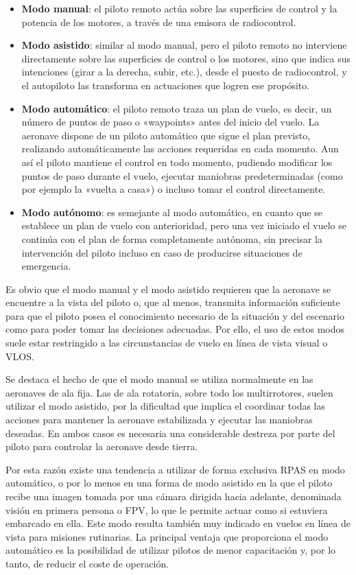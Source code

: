 \begin{itemize}
\item \textbf{Modo manual}: el piloto remoto actúa sobre las superficies de control y la potencia de los motores, 
a través de una emisora de radiocontrol.
\item \textbf{Modo asistido}: similar al modo manual, pero el piloto remoto no interviene directamente sobre las superficies de 
control o los motores, sino que indica sus intenciones (girar a la derecha, subir, etc.), desde el puesto de radiocontrol, y el 
autopiloto las transforma en actuaciones que logren ese propósito.
\item \textbf{Modo automático}: el piloto remoto traza un plan de vuelo, es decir, un número de puntos de paso o «waypoints» antes del 
inicio del vuelo. La aeronave dispone de un piloto automático que sigue el plan previsto, realizando automáticamente las acciones 
requeridas en cada momento. Aun así el piloto mantiene el control en todo momento, pudiendo modificar los puntos de paso durante el vuelo, ejecutar maniobras predeterminadas (como por ejemplo la «vuelta a casa») o incluso tomar el control directamente.
\item \textbf{Modo autónomo}: es semejante al modo automático, en cuanto que se establece un plan de vuelo con anterioridad, 
pero una vez iniciado el vuelo se continúa con el plan de forma completamente autónoma, sin precisar la intervención del piloto 
incluso en caso de producirse situaciones de emergencia.
\end{itemize}

Es obvio que el modo manual y el modo asistido requieren que la aeronave se encuentre a la vista del piloto o, que al menos, 
transmita información suficiente para que el piloto posea el conocimiento necesario de la situación y del escenario como para poder tomar las decisiones adecuadas. Por ello, el uso de estos modos suele estar restringido a las circunstancias de vuelo en línea de vista visual o \acs{VLOS}.

Se destaca el hecho de que el modo manual se utiliza normalmente en las aeronaves de ala fija. Las de ala rotatoria, 
sobre todo los multirrotores, suelen utilizar el modo asistido, por la dificultad que implica el coordinar todas las acciones 
para mantener la aeronave estabilizada y ejecutar las maniobras deseadas. En ambos casos es necesaria una considerable destreza 
por parte del piloto para controlar la aeronave desde tierra.

Por esta razón existe una tendencia a utilizar de forma exclusiva \acs{RPAS} en modo automático, o por lo menos en una forma de modo 
asistido en la que el piloto recibe una imagen tomada por una cámara dirigida hacia adelante, denominada visión en primera persona 
o \acs{FPV}, lo que le permite actuar como si estuviera embarcado en ella. Este modo resulta también muy indicado en vuelos en línea de vista para misiones rutinarias. La principal ventaja que proporciona el modo automático es la posibilidad de utilizar pilotos de menor capacitación y, por lo tanto, de reducir el coste de operación.

